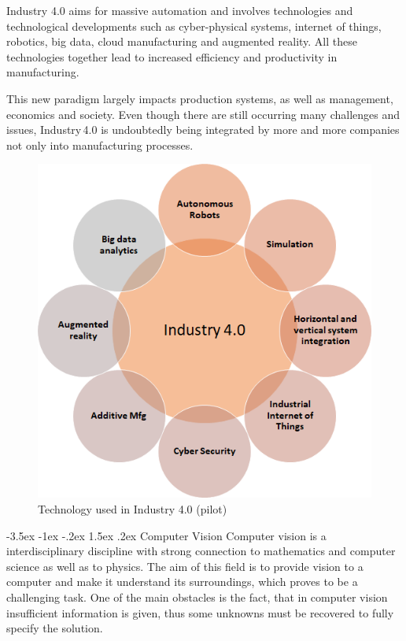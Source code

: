 \documentclass[a4paper,10pt]{article}
\makeatletter
\theoremstyle{definition}
\renewcommand\section{\@startsection {section}{1}{\z@}%
	{-3.5ex \@plus -1ex \@minus -.2ex}%
	{1.5ex \@plus.2ex}%
	{\large\bfseries}}
\makeatother
\begin{document}
	Industry 4.0 aims for massive automation and involves technologies and technological developments such as cyber-physical systems, internet of things, robotics, big data, cloud manufacturing and augmented reality. All these technologies together lead to increased efficiency and productivity in manufacturing. \cite{industry_4_0_concepts}
	
	This new paradigm largely impacts production systems, as well as management, economics and society. Even though there are still occurring many challenges and issues, Industry\,4.0 is undoubtedly being integrated by more and more companies not only into manufacturing processes. \cite{industry_4_0}\cite{industry_4_0_concepts}
	
	\begin{figure}[h]
		\begin{center}
			\includegraphics[scale=0.6]{image/i4.png}
			\caption{Technology used in Industry 4.0 (pilot)\cite{industry_4_0_slide}}
			\label{fig:1}
		\end{center}
	\end{figure}
	
	\section{Computer Vision}
	\label{sec:3}
	Computer vision is a interdisciplinary discipline with strong connection to mathematics and computer science as well as to physics. The aim of this field is to provide vision to a computer and make it understand its surroundings, which proves to be a challenging task. One of the main obstacles is the fact, that in computer vision insufficient information is given, thus some unknowns must be recovered to fully specify the solution.
	
\end{document}
